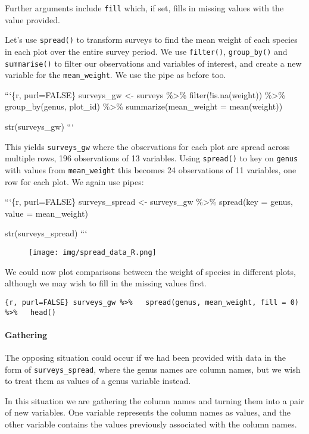 \documentclass[]{article}
\let\oldparagraph\paragraph
\renewcommand{\paragraph}[1]{\oldparagraph{#1}\mbox{}}
\begin{document}
Further arguments include \texttt{fill} which, if set, fills in missing
values with the value provided.

Let's use \texttt{spread()} to transform surveys to find the mean weight
of each species in each plot over the entire survey period. We use
\texttt{filter()}, \texttt{group\_by()} and \texttt{summarise()} to
filter our observations and variables of interest, and create a new
variable for the \texttt{mean\_weight}. We use the pipe as before too.

```\{r, purl=FALSE\} surveys\_gw \textless{}- surveys \%\textgreater{}\%
filter(!is.na(weight)) \%\textgreater{}\% group\_by(genus, plot\_id)
\%\textgreater{}\% summarize(mean\_weight = mean(weight))

str(surveys\_gw) ```

This yields \texttt{surveys\_gw} where the observations for each plot
are spread across multiple rows, 196 observations of 13 variables. Using
\texttt{spread()} to key on \texttt{genus} with values from
\texttt{mean\_weight} this becomes 24 observations of 11 variables, one
row for each plot. We again use pipes:

```\{r, purl=FALSE\} surveys\_spread \textless{}- surveys\_gw
\%\textgreater{}\% spread(key = genus, value = mean\_weight)

str(surveys\_spread) ```

\begin{figure}
\centering
\texttt{[image: img/spread\_data\_R.png]}
\caption{}
\end{figure}

We could now plot comparisons between the weight of species in different
plots, although we may wish to fill in the missing values first.

\texttt{\{r,\ purl=FALSE\}\ surveys\_gw\ \%\textgreater{}\%\ \ \ spread(genus,\ mean\_weight,\ fill\ =\ 0)\ \%\textgreater{}\%\ \ \ head()}

\paragraph{Gathering}\label{gathering}

The opposing situation could occur if we had been provided with data in
the form of \texttt{surveys\_spread}, where the genus names are column
names, but we wish to treat them as values of a genus variable instead.

In this situation we are gathering the column names and turning them
into a pair of new variables. One variable represents the column names
as values, and the other variable contains the values previously
associated with the column names.
\end{document}
